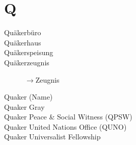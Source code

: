 \section*{Q}

\articlesize

\begin{description}

 \item[Quäkerbüro]

 \item[Quäkerhaus]

 \item[Quäkerspeisung]

 \item[Quäkerzeugnis] $\to$Zeugnis

 \item[Quaker (Name)]

 \item[Quaker Gray]

 \item[Quaker Peace \& Social Witness (QPSW)]

 \item[Quaker United Nations Office (QUNO)]

  \item[Quaker Universalist Fellowship]

 \end{description}

\normalsize

